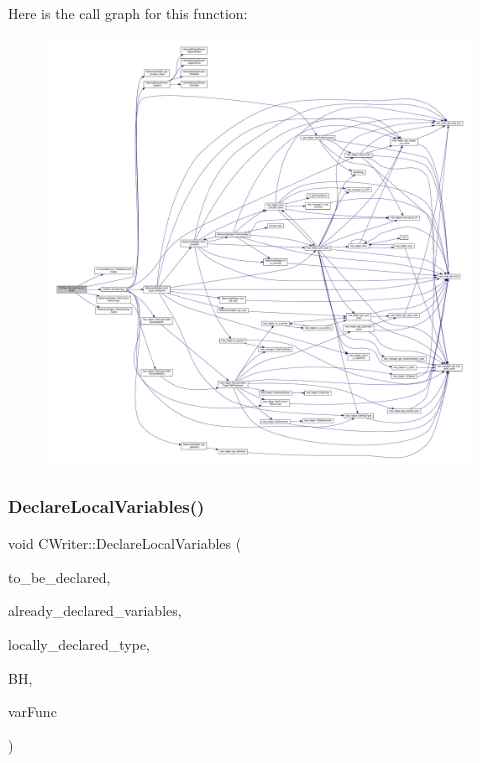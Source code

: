 Here is the call graph for this function\+:
\nopagebreak
\begin{figure}[H]
\begin{center}
\leavevmode
\includegraphics[width=350pt]{d3/d59/classCWriter_a0a14899d7e4f403c1ee6e612566cd9f4_cgraph}
\end{center}
\end{figure}
\mbox{\label{classCWriter_ab269f8330141bcdeecda80a23e60c8f5}} 
\subsubsection{\texorpdfstring{Declare\+Local\+Variables()}{DeclareLocalVariables()}}
{\footnotesize\ttfamily void C\+Writer\+::\+Declare\+Local\+Variables (\begin{DoxyParamCaption}\item[{const \hyperlink{custom__set_8hpp_a615bc2f42fc38a4bb1790d12c759e86f}{Custom\+Set}$<$ unsigned int $>$ \&}]{to\+\_\+be\+\_\+declared,  }\item[{\hyperlink{custom__set_8hpp_a615bc2f42fc38a4bb1790d12c759e86f}{Custom\+Set}$<$ unsigned int $>$ \&}]{already\+\_\+declared\+\_\+variables,  }\item[{\hyperlink{custom__set_8hpp_a615bc2f42fc38a4bb1790d12c759e86f}{Custom\+Set}$<$ std\+::string $>$ \&}]{locally\+\_\+declared\+\_\+type,  }\item[{const \hyperlink{behavioral__helper_8hpp_aae973b54cac87eef3b27442aa3e1e425}{Behavioral\+Helper\+Const\+Ref}}]{BH,  }\item[{const \hyperlink{var__pp__functor_8hpp_a8a6b51b6519401d911398943510557f0}{var\+\_\+pp\+\_\+functor\+Const\+Ref}}]{var\+Func }\end{DoxyParamCaption})\hspace{0.3cm}{\ttfamily [virtual]}}



